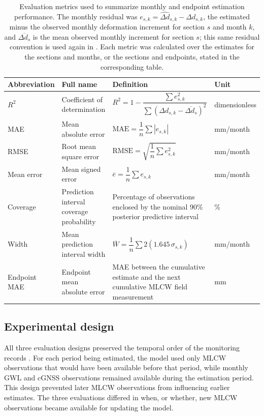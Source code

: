 \begin{table}[!ht]
  \centering
  \small
  \renewcommand{\arraystretch}{1.3}
  \caption[Evaluation metrics.]{Evaluation metrics used to summarize monthly and endpoint estimation performance. The monthly residual was $e_{s,k}=\widehat{\Delta d}_{s,k}-\Delta d_{s,k}$, the estimated minus the observed monthly deformation increment for section $s$ and month $k$, and $\overline{\Delta d_{s}}$ is the mean observed monthly increment for section $s$; this same residual convention is used again in . Each metric was calculated over the estimates for the sections and months, or the sections and endpoints, stated in the corresponding table.}
  \label{tab:evaluation_metrics}
  \begin{tabular}{lp{}p{}l}
    \toprule
    \textbf{Abbreviation} & \textbf{Full name} & \textbf{Definition} & \textbf{Unit} \\
    \midrule
    $R^2$ & Coefficient of determination & $R^{2}=1-\dfrac{\sum e_{s,k}^{2}}{\sum\left(\Delta d_{s,k}-\overline{\Delta d_{s}}\right)^{2}}$ & dimensionless \\
    MAE & Mean absolute error & $\mathrm{MAE}=\dfrac{1}{n}\sum\left\lvert e_{s,k}\right\rvert$ & mm/month \\
    RMSE & Root mean square error & $\mathrm{RMSE}=\sqrt{\dfrac{1}{n}\sum e_{s,k}^{2}}$ & mm/month \\
    Mean error & Mean signed error & $\overline{e}=\dfrac{1}{n}\sum e_{s,k}$ & mm/month \\
    Coverage & Prediction interval coverage probability & Percentage of observations enclosed by the nominal 90\% posterior predictive interval & \% \\
    Width & Mean prediction interval width & $\overline{W}=\dfrac{1}{n}\sum 2\left(1.645\,\sigma_{s,k}\right)$ & mm/month \\
    Endpoint MAE & Endpoint mean absolute error & MAE between the cumulative estimate and the next cumulative MLCW field measurement & mm \\
    \bottomrule
  \end{tabular}
\end{table}

\subsection{Experimental design}
\label{subsec:experimental_design}

All three evaluation designs preserved the temporal order of the monitoring records \citep{bergmeir_2012_crossvalidation}. For each period being estimated, the model used only MLCW observations that would have been available before that period, while monthly GWL and cGNSS observations remained available during the estimation period. This design prevented later MLCW observations from influencing earlier estimates. The three evaluations differed in when, or whether, new MLCW observations became available for updating the model.

